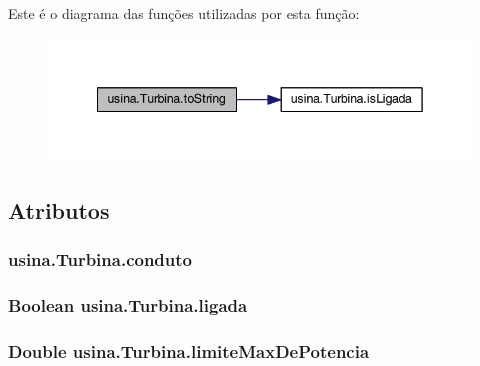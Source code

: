 Este é o diagrama das funções utilizadas por esta função\-:\nopagebreak
\begin{figure}[H]
\begin{center}
\leavevmode
\includegraphics[width=342pt]{classusina_1_1_turbina_af0070ee6333afe97856a58e309e72064_cgraph}
\end{center}
\end{figure}




\subsection{Atributos}
\hypertarget{classusina_1_1_turbina_aaf9ebcc66e369abbf1ccf644579e1348}{
\subsubsection[{conduto}]{ usina.\-Turbina.\-conduto\hspace{0.3cm}{\ttfamily [private]}}}\label{classusina_1_1_turbina_aaf9ebcc66e369abbf1ccf644579e1348}
\hypertarget{classusina_1_1_turbina_afe4aa27ba1150a9b4a2a7d9ec622ab4f}{
\subsubsection[{ligada}]{\setlength{\rightskip}{0pt plus 5cm}Boolean usina.\-Turbina.\-ligada\hspace{0.3cm}{\ttfamily [private]}}}\label{classusina_1_1_turbina_afe4aa27ba1150a9b4a2a7d9ec622ab4f}
\hypertarget{classusina_1_1_turbina_ab6648bca34b30eedf9f9246fe7bfde00}{
\subsubsection[{limite\-Max\-De\-Potencia}]{\setlength{\rightskip}{0pt plus 5cm}Double usina.\-Turbina.\-limite\-Max\-De\-Potencia\hspace{0.3cm}{\ttfamily [private]}}}\label{classusina_1_1_turbina_ab6648bca34b30eedf9f9246fe7bfde00}
